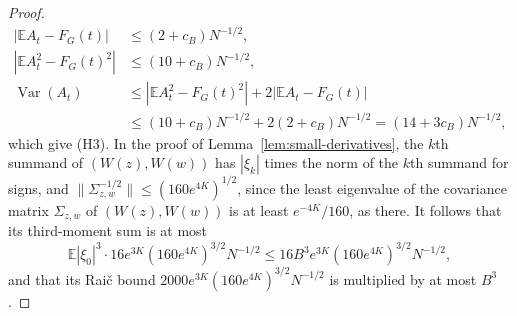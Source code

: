\begin{proof}
\begin{align*}
 |\mathbb EA_t-F_G(t)|&\le(2+c_B)N^{-1/2},\\
 |\mathbb EA_t^2-F_G(t)^2|&\le(10+c_B)N^{-1/2},\\
 \operatorname{Var}(A_t)
 &\le|\mathbb EA_t^2-F_G(t)^2|+2|\mathbb EA_t-F_G(t)|\\
 &\le(10+c_B)N^{-1/2}+2(2+c_B)N^{-1/2}
 =(14+3c_B)N^{-1/2},
\end{align*}
which give (H3).
In the proof of Lemma~\ref{lem:small-derivatives}, the $k$th summand of
$(W(z),W(w))$ has $|\xi_k|$ times the norm of the $k$th summand for
signs, and $\|\Sigma_{z,w}^{-1/2}\|\le(160e^{4K})^{1/2}$, since the least
eigenvalue of the covariance matrix $\Sigma_{z,w}$ of $(W(z),W(w))$ is at
least $e^{-4K}/160$, as there.
It follows that its third-moment sum is at most
\[
 \mathbb E|\xi_0|^3\cdot16e^{3K}(160e^{4K})^{3/2}N^{-1/2}
 \le16B^3e^{3K}(160e^{4K})^{3/2}N^{-1/2},
\]
and that its Rai\v{c} bound $2000e^{3K}(160e^{4K})^{3/2}N^{-1/2}$ is
multiplied by at most $B^3$.


\end{proof}
